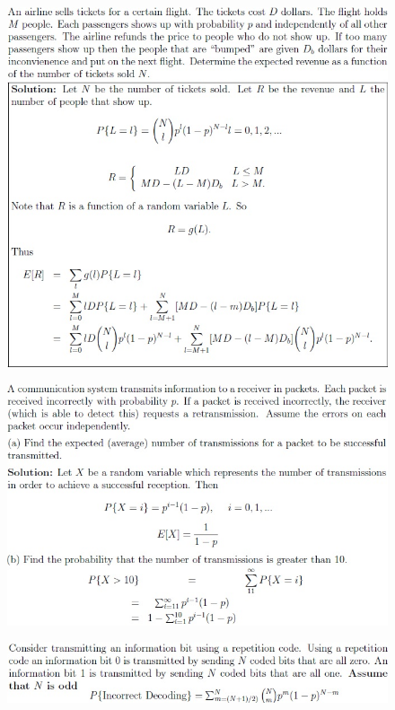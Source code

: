 \documentclass[11pt,landscape]{article}
\begin{document}
\begin{multicols}{3}
\setlength{\premulticols}{1pt}
\setlength{\postmulticols}{1pt}
\setlength{\multicolsep}{1pt}
\setlength{\columnsep}{2pt}

\begin{figure}[H]
    \includegraphics[scale=0.46]{./Images/Airplanes.jpg}
\end{figure}
\begin{figure}[H]
    \includegraphics[scale=0.46]{./Images/Communication.jpg}
\end{figure}
\begin{figure}[H]
    \includegraphics[scale=0.46]{./Images/HammingCode.jpg}

\end{figure}
\end{multicols}
\end{document}
